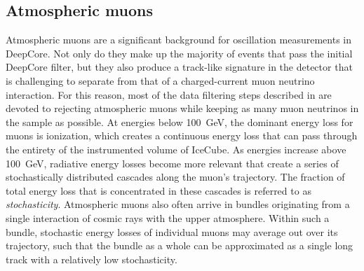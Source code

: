 \subsection{Atmospheric muons}
Atmospheric muons are a significant background for oscillation measurements in DeepCore.
Not only do they make up the majority of events that pass the initial DeepCore filter, but they also produce a track-like signature in the detector that is challenging to separate from that of a charged-current muon neutrino interaction.
For this reason, most of the data filtering steps described in  are devoted to rejecting atmospheric muons while keeping as many muon neutrinos in the sample as possible.
At energies below 100~GeV, the dominant energy loss for muons is ionization, which creates a continuous energy loss that can pass through the entirety of the instrumented volume of IceCube.
As energies increase above 100~GeV, radiative energy losses become more relevant that create a series of stochastically distributed cascades along the muon's trajectory.
The fraction of total energy loss that is concentrated in these cascades is referred to as \emph{stochasticity}.
Atmospheric muons also often arrive in bundles originating from a single interaction of cosmic rays with the upper atmosphere.
Within such a bundle, stochastic energy losses of individual muons may average out over its trajectory, such that the bundle as a whole can be approximated as a single long track with a relatively low stochasticity.
